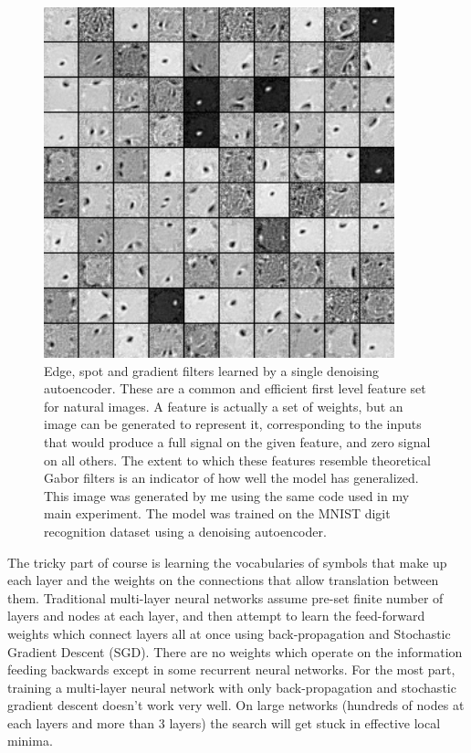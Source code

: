 \documentclass[12pt]{article}
\begin{document}
\begin{doublespacing}
\begin{figure}[p]
\centering
\includegraphics[width=4in,height=4in]{filters_corruption_30}
\caption{Edge, spot and gradient filters learned by a single denoising autoencoder. These are a common and efficient first level feature set for natural images. A feature is actually a set of weights, but an image can be generated to represent it, corresponding to the inputs that would produce a full signal on the given feature, and zero signal on all others. The extent to which these features resemble theoretical Gabor filters is an indicator of how well the model has generalized. This image was generated by me using the same code used in my main experiment. The model was trained on the MNIST digit recognition dataset using a denoising autoencoder.}
\label{fig:gaborz}
\end{figure}
	
	The tricky part of course is learning the vocabularies of symbols that make up each layer and the weights on the connections that allow translation between them. Traditional multi-layer neural networks assume pre-set finite number of layers and nodes at each layer, and then attempt to learn the feed-forward weights which connect layers  all at once using back-propagation and Stochastic Gradient Descent (SGD). There are no weights which operate on the information feeding backwards except in some recurrent neural networks. For the most part, training a multi-layer neural network with only back-propagation and stochastic gradient descent doesn't work very well. On large networks (hundreds of nodes at each layers and more than 3 layers) the search will get stuck in effective local minima\cite{erhan2009difficulty, hinton2006reducing}.
	

\end{doublespacing}
\end{document}
